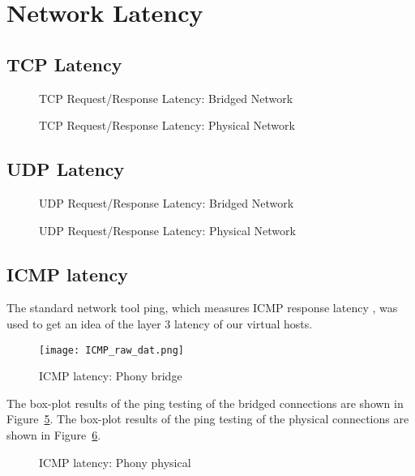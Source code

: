 
\section{Network Latency} %
\label{sec:networklatency}

\subsection{TCP Latency} %
\label{sub:tcplatency}
\begin{figure}
    \centering
    
    \caption{TCP Request/Response Latency: Bridged Network}
    \label{fig:tcp_rr_bridge}
\end{figure}
\begin{figure}
    \centering
    \def\svgwidth{\columnwidth}
    
    \caption{TCP Request/Response Latency: Physical Network}
    \label{fig:tcp_rr_phys}
\end{figure}


\subsection{UDP Latency} %
\label{sub:udplatency}
\begin{figure}
    \centering
    \def\svgwidth{\columnwidth}
    
    \caption{UDP Request/Response Latency: Bridged Network}
    \label{fig:udp_rr_bridge}
\end{figure}
\begin{figure}
    \centering
    \def\svgwidth{\columnwidth}
    
    \caption{UDP Request/Response Latency: Physical Network}
    \label{fig:udp_rr_phys}
\end{figure}

\subsection{ICMP latency} %
\label{sub:icmplatency}
The standard network tool ping, which measures ICMP response latency \autocite{pingexplained}, was used to get an idea of the layer 3 latency of our virtual hosts.  
\begin{figure}
    \centering
    \texttt{[image: ICMP\_raw\_dat.png]}
%    
    \caption{ICMP latency: Phony bridge}
    \label{fig:icmplatencybridge}
\end{figure}
The box-plot results of the ping testing of the bridged connections are shown in Figure~\ref{fig:icmplatencybridge}.  
The box-plot results of the ping testing of the physical connections are shown in Figure~\ref{fig:icmplatencyphys}.  
\begin{figure}
    \centering
    \def\svgwidth{\columnwidth}
    
    \caption{ICMP latency: Phony physical}
    \label{fig:icmplatencyphys}
\end{figure}

